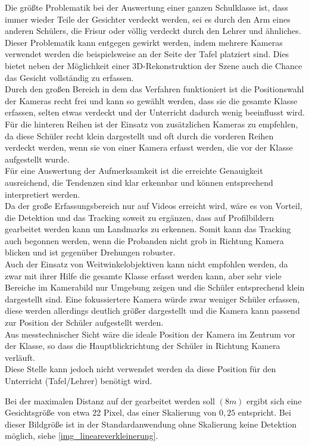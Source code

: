 Die größte Problematik bei der Auswertung einer ganzen Schulklasse ist, dass immer wieder Teile der Gesichter verdeckt werden, sei es durch den Arm eines anderen Schülers, die Frisur oder völlig verdeckt durch den Lehrer und ähnliches.\\
Dieser Problematik kann entgegen gewirkt werden, indem mehrere Kameras verwendet werden die beispielsweise an der Seite der Tafel platziert sind. Dies bietet neben der Möglichkeit einer 3D-Rekonstruktion der Szene auch die Chance das Gesicht vollständig zu erfassen.\\
Durch den großen Bereich in dem das Verfahren funktioniert ist die Positionswahl der Kameras recht frei und kann so gewählt werden, dass sie die gesamte Klasse erfassen, selten etwas verdeckt und der Unterricht dadurch wenig beeinflusst wird.\\
Für die hinteren Reihen ist der Einsatz von zusätzlichen Kameras zu empfehlen, da diese Schüler recht klein dargestellt und oft durch die vorderen Reihen verdeckt werden, wenn sie von einer Kamera erfasst werden, die vor der Klasse aufgestellt wurde.\\
Für eine Auswertung der Aufmerksamkeit ist die erreichte Genauigkeit ausreichend, die Tendenzen sind klar erkennbar und können entsprechend interpretiert werden.\\
Da der große Erfassungsbereich nur auf Videos erreicht wird, wäre es von Vorteil, die Detektion und das Tracking soweit zu ergänzen, dass auf Profilbildern gearbeitet werden kann um Landmarks zu erkennen. Somit kann das Tracking auch begonnen werden, wenn die Probanden nicht grob in Richtung Kamera blicken und ist gegenüber Drehungen robuster.\\
Auch der Einsatz von Weitwinkelobjektiven kann nicht empfohlen werden, da zwar mit ihrer Hilfe die gesamte Klasse erfasst werden kann, aber sehr viele Bereiche im Kamerabild nur Umgebung zeigen und die Schüler entsprechend klein dargestellt sind. Eine fokussiertere Kamera würde zwar weniger Schüler erfassen, diese werden allerdings deutlich größer dargestellt und die Kamera kann passend zur Position der Schüler aufgestellt werden.\\

Aus messtechnischer Sicht wäre die ideale Position der Kamera im Zentrum vor der Klasse, so dass die Hauptblickrichtung der Schüler in Richtung Kamera verläuft.\\
Diese Stelle kann jedoch nicht verwendet werden da diese Position für den Unterricht (Tafel/Lehrer) benötigt wird.

Bei der maximalen Distanz auf der gearbeitet werden soll $(8m)$ ergibt sich eine Gesichtsgröße von etwa 22 Pixel, das einer Skalierung von $0,25$ entspricht. Bei dieser Bildgröße ist in der Standardanwendung ohne Skalierung keine Detektion möglich, siehe \autoref{img_lineareverkleinerung}.
